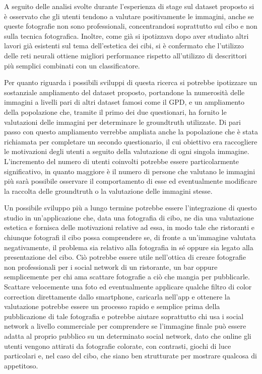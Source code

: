 A seguito delle analisi svolte durante l'esperienza di stage sul dataset proposto si è osservato che gli utenti tendono a valutare positivamente le immagini, anche se queste fotografie non sono professionali, concentrandosi soprattutto sul cibo e non sulla tecnica fotografica. Inoltre, come già si ipotizzava dopo aver studiato altri lavori \cite{sheng2021learning} già esistenti sul tema dell'estetica dei cibi, si è confermato che l'utilizzo delle reti neurali ottiene migliori performance rispetto all'utilizzo di descrittori più semplici combinati con un classificatore.

Per quanto riguarda i possibili sviluppi di questa ricerca si potrebbe ipotizzare un sostanziale ampliamento del dataset proposto, portandone la numerosità delle immagini a livelli pari di altri dataset famosi come il GPD, e un ampliamento della popolazione che, tramite il primo dei due questionari, ha fornito le valutazioni delle immagini per determinare le groundtruth utilizzate.  Di pari passo con questo ampliamento verrebbe ampliata anche la popolazione che è stata richiamata per completare un secondo questionario, il cui obiettivo era raccogliere le motivazioni degli utenti a seguito della valutazione di ogni singola immagine.
L'incremento del numero di utenti coinvolti potrebbe essere particolarmente significativo, in quanto maggiore è il numero di persone che valutano le immagini più sarà possibile osservare il comportamento di esse ed eventualmente modificare la raccolta delle groundtruth o la valutazione delle immagini stesse.

Un possibile sviluppo più a lungo termine potrebbe essere l'integrazione di questo studio in un'applicazione che, data una fotografia di cibo, ne dia una valutazione estetica e fornisca delle motivazioni relative ad essa, in modo tale che ristoranti e chiunque fotografi il cibo possa comprendere se, di fronte a un'immagine valutata negativamente, il problema sia relativo alla fotografia in sé oppure sia legato alla presentazione del cibo. Ciò potrebbe essere utile nell'ottica di creare fotografie non professionali per i social network di un ristorante, un bar oppure semplicemente per chi ama scattare fotografie a ciò che mangia per pubblicarle. Scattare velocemente una foto ed eventualmente applicare qualche filtro di color correction direttamente dallo smartphone, caricarla nell'app e ottenere la valutazione potrebbe essere un processo rapido e semplice prima della pubblicazione di tale fotografia e potrebbe aiutare soprattutto chi usa i social network a livello commerciale per comprendere se l'immagine finale può essere adatta al proprio pubblico su un determinato social network, dato che online gli utenti vengono attirati da fotografie colorate, con contrasti, giochi di luce particolari e, nel caso del cibo, che siano ben strutturate per mostrare qualcosa di appetitoso.